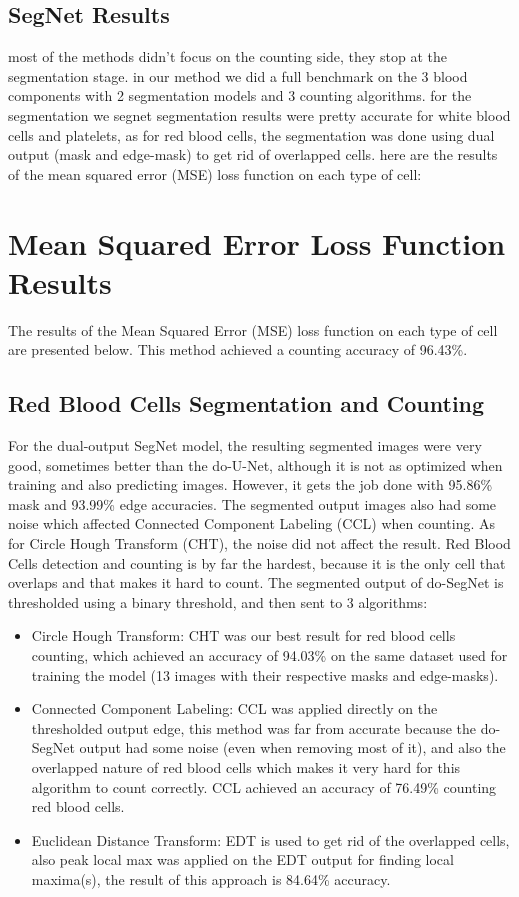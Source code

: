 \documentclass[conference]{IEEEtran}
\begin{document}
\subsection{SegNet Results}
most of the methods didn’t focus on the counting side, they stop at the segmentation stage. in our method we did a full benchmark on the 3 blood components with 2 segmentation models and 3 counting algorithms. for the segmentation we 
segnet segmentation results were pretty accurate for white blood cells and platelets, as for red blood cells, the segmentation was done using dual output (mask and edge-mask) to get rid of overlapped cells.
here are the results of the mean squared error (MSE) loss function on each type of cell:

\section{Mean Squared Error Loss Function Results}
The results of the Mean Squared Error (MSE) loss function on each type of cell are presented below. This method achieved a counting accuracy of 96.43\%.
\subsection{Red Blood Cells Segmentation and Counting}
For the dual-output SegNet model, the resulting segmented images were very good, sometimes better than the do-U-Net, although it is not as optimized when training and also predicting images. However, it gets the job done with 95.86\% mask and 93.99\% edge accuracies. The segmented output images also had some noise which affected Connected Component Labeling (CCL) when counting. As for Circle Hough Transform (CHT), the noise did not affect the result. Red Blood Cells detection and counting is by far the hardest, because it is the only cell that overlaps and that makes it hard to count. The segmented output of do-SegNet is thresholded using a binary threshold, and then sent to 3 algorithms:
\begin{itemize}
\item Circle Hough Transform: CHT was our best result for red blood cells counting, which achieved an accuracy of 94.03\% on the same dataset used for training the model (13 images with their respective masks and edge-masks).
\item Connected Component Labeling: CCL was applied directly on the thresholded output edge, this method was far from accurate because the do-SegNet output had some noise (even when removing most of it), and also the overlapped nature of red blood cells which makes it very hard for this algorithm to count correctly. CCL achieved an accuracy of 76.49\% counting red blood cells.
\item Euclidean Distance Transform: EDT is used to get rid of the overlapped cells, also peak local max was applied on the EDT output for finding local maxima(s), the result of this approach is 84.64\% accuracy.
\end{itemize}
\end{document}
